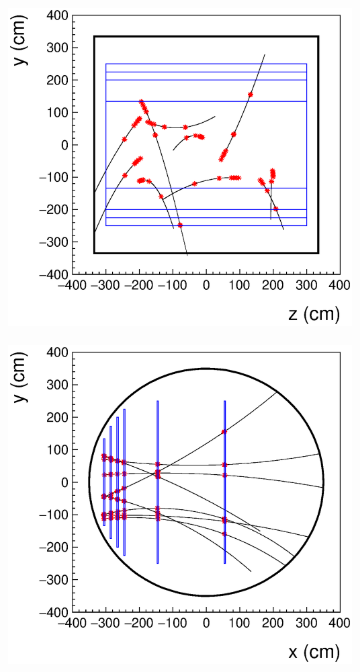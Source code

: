 \begin{figure}[t]
     \centering
     \begin{subfigure}[b]{0.48\textwidth}
         \centering
         \includegraphics[width=\textwidth]{figures/ch4-KF_NDGArLite/Toy/YZ_view.eps}
         \caption{}
         \label{fig:YZViewGArLite}
     \end{subfigure}
     \begin{subfigure}[b]{0.48\textwidth}
         \centering
         \includegraphics[width=\textwidth]{figures/ch4-KF_NDGArLite/Toy/XY_view.eps}

\end{subfigure}
\end{figure}
